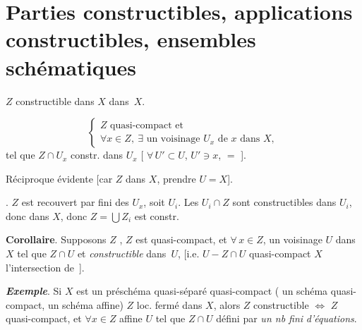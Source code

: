 \documentclass[11pt,a4paper]{article}
\begin{document}
\section{Parties constructibles, applications constructibles, ensembles schématiques}

$Z$ constructible dans $X$ \ill{}  \ill{}   \ill{}
  dans~$X$.

\[
\begin{cases}
Z \text{ quasi-compact et} \\
\forall x \in Z,\ \exists \text{ un voisinage } U_x \text{ de } x \text{ dans } X,
\end{cases}
\]
tel que $Z \cap U_x$ constr. dans $U_x$
[ $\forall\, U' \subset U$, $U' \ni x$, \ill{} $=$ ].

Réciproque évidente [car $Z$ \ill{} dans $X$,  prendre $U = X$].

. $Z$ est recouvert par  fini des
$U_x$, soit $U_i$. Les $U_i \cap Z$ sont constructibles
dans $U_i$, donc dans $X$, donc $Z = \bigcup Z_i$ est constr.

\textbf{Corollaire}. Supposons $Z$ , \ill{}  \ill{}
\struck{\ill{}} 
 $Z$ est quasi-compact, et $\forall\, x \in Z$, un
voisinage  $U$ dans $X$ tel que $Z \cap U$  
et \emph{constructible} dans~$U$,
[i.e. $U - Z \cap U$ quasi-compact 
\ill{}  $X$ l'intersection de    \ill{}
\,].

\textbf{\emph{Exemple}}. Si $X$ est un préschéma quasi-séparé quasi-compact
( un schéma quasi-compact,  un schéma affine) \struck{\ill{}}
$Z$ loc. fermé dans $X$, alors $Z$ constructible $\Longleftrightarrow$ $Z$ quasi-compact, et
$\forall x \in Z$ \struck{\ill{}}    affine $U$ tel que $Z \cap U$
 défini par \emph{un nb fini} \emph{d'équations}.

\end{document}
